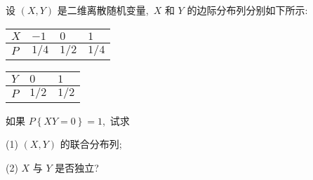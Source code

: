    \begin{example}
   	设 $(X,Y)$ 是二维离散随机变量,\ $X$ 和 $Y$ 的边际分布列分别如下所示:
   	\begin{table}[h]
   		\centering
   		\begin{tabularx}{0.4\textwidth}{Z|ZZZ}
   			\hline
   			$X$ & $-1$ & $0$ & $1$\\
   			\hline
   			$P$ & $1/4$ & $1/2$ & $1/4$\\
   			\hline
   		\end{tabularx}
   	    \qquad
   	    \begin{tabularx}{0.4\textwidth}{Z|ZZ}
   	    	\hline
   	    	$Y$ & $0$ & $1$\\
   	    	\hline
   	    	$P$ & $1/2$ & $1/2$\\
   	    	\hline
   	    \end{tabularx}
   	\end{table}
   如果 $P\left\{XY=0\right\}=1$,\ 试求
   
   (1) $(X,Y)$ 的联合分布列;
   
   (2) $X$ 与 $Y$ 是否独立?

   \end{example}
